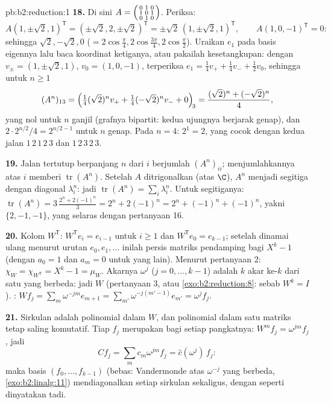 \begin{solution}{pb:b2:reduction:1}
\textbf{18.} Di sini $A = \begin{psmallmatrix} 0&1&0\\ 1&0&1\\
0&1&0\end{psmallmatrix}$. Periksa:
\[
A(1, \pm\sqrt2, 1)^{\mathsf T}
= (\pm\sqrt2, 2, \pm\sqrt2)^{\mathsf T}
= \pm\sqrt2\,(1, \pm\sqrt2, 1)^{\mathsf T},
\qquad
A(1, 0, -1)^{\mathsf T} = 0 :
\]
sehingga  $\sqrt2, -\sqrt2, 0$ ($= 2\cos\frac\pi4,
2\cos\frac{3\pi}4, 2\cos\frac\pi2$). Uraikan $e_1$ pada
basis eigennya lalu baca koordinat ketiganya, atau pakailah kesetangkupan:
dengan $v_\pm = (1, \pm\sqrt2, 1)$, $v_0 = (1, 0, -1)$, terperiksa $e_1
= \frac14 v_+ + \frac14 v_- + \frac12 v_0$, sehingga untuk $n \geq 1$
\[
(A^n)_{13} = \Bigl(\tfrac14(\sqrt2)^n v_+ +
\tfrac14(-\sqrt2)^n v_- + 0\Bigr)_{\!3}
= \frac{(\sqrt2)^n + (-\sqrt2)^n}{4},
\]
yang nol untuk $n$ ganjil (grafnya bipartit: kedua ujungnya berjarak
genap), dan $2\cdot 2^{n/2}/4 = 2^{n/2 - 1}$ untuk $n$ genap. Pada $n = 4$:
$2^{1} = 2$, yang cocok dengan kedua jalan $1\,2\,1\,2\,3$ dan
$1\,2\,3\,2\,3$.

\textbf{19.} Jalan tertutup berpanjang $n$ dari $i$ berjumlah
$(A^n)_{ii}$; menjumlahkannya atas $i$ memberi $\operatorname{tr}(A^n)$.
Setelah $A$ ditrigonalkan (atas $\C$), $A^n$ menjadi segitiga dengan
diagonal $\lambda_i^n$: jadi $\operatorname{tr}(A^n) = \sum_i\lambda_i^n$.
Untuk segitiganya: $\operatorname{tr}(A^n) = 3\,\frac{2^n + 2(-1)^n}3 =
2^n + 2(-1)^n = 2^n + (-1)^n + (-1)^n$, yakni  $\{2, -1,
-1\}$, yang selaras dengan pertanyaan 16.

\textbf{20.} Kolom $W^{\mathsf T}$: $W^{\mathsf T}e_i =
e_{i-1}$ untuk $i \geq 1$ dan $W^{\mathsf T}e_0 = e_{k-1}$;
setelah dinamai ulang menurut urutan $e_0, e_1, \dots$ inilah persis
matriks pendamping bagi $X^k - 1$ (dengan $a_0 = 1$ dan $a_m = 0$ untuk yang lain).
Menurut pertanyaan 2: $\chi_{W} = \chi_{W^{\mathsf T}} = X^k - 1 =
\mu_{W}$. Akarnya $\omega^j$ ($j = 0, \dots, k-1$) adalah $k$
akar ke-$k$ dari satu yang berbeda: jadi $W$ 
(pertanyaan 3, atau \cref{exo:b2:reduction:8}: sebab $W^k = I$). : $Wf_j = \sum_m \omega^{-jm}e_{m+1} =
\sum_{m'}\omega^{-j(m'-1)}e_{m'} = \omega^j f_j$.

\textbf{21.} Sirkulan adalah polinomial dalam $W$, dan polinomial
dalam satu matriks tetap saling komutatif. Tiap $f_j$ merupakan
 bagi setiap pangkatnya: $W^m f_j = \omega^{jm}f_j$, jadi
\[
Cf_j = \sum_m c_m\omega^{jm} f_j = \widehat c(\omega^j)\,f_j :
\]
maka basis $(f_0, \dots, f_{k-1})$ (bebas: Vandermonde atas
$\omega^{-j}$ yang berbeda, \cref{exo:b2:linalg:11}) mendiagonalkan
setiap sirkulan sekaligus, dengan  seperti dinyatakan tadi.


\end{solution}

